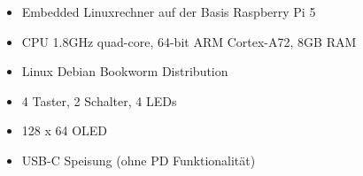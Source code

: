 
\begin{itemize}
    \item Embedded Linuxrechner auf der Basis Raspberry Pi 5
    \item CPU 1.8GHz quad-core, 64-bit ARM Cortex-A72, 8GB RAM
    \item Linux Debian Bookworm Distribution
    \item 4 Taster, 2 Schalter, 4 LEDs
    \item 128 x 64 OLED
    \item USB-C Speisung (ohne PD Funktionalität)
\end{itemize}
